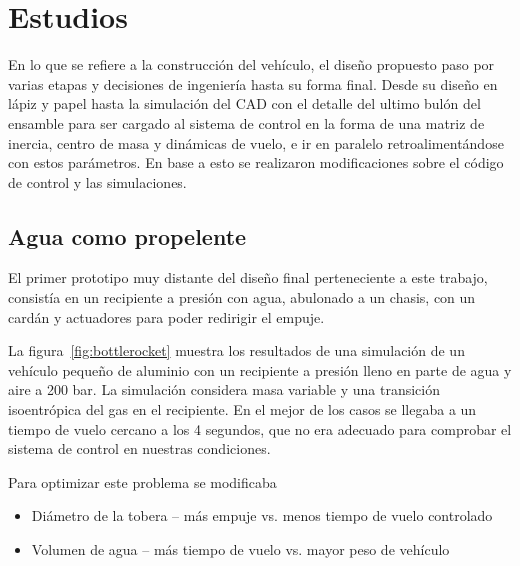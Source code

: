


\section{Estudios}
En lo que se refiere a la construcción del vehículo, el diseño propuesto paso por varias etapas y
decisiones de ingeniería hasta su forma final. Desde su diseño en lápiz y papel hasta la
simulación del CAD con el detalle del ultimo bulón del ensamble para ser cargado al sistema de control en la forma de una matriz de inercia, centro de masa y dinámicas de vuelo, e ir en paralelo retroalimentándose con estos parámetros. En base a esto se realizaron modificaciones sobre el código de control y las simulaciones.


\subsection{Agua como propelente}\label{ssec:propAgua}
El primer prototipo muy distante del diseño final perteneciente a este trabajo, consistía en un
recipiente a presión con agua, abulonado a un chasis, con un cardán y actuadores para poder redirigir el
empuje. 

\medskip

La figura~\ref{fig:bottlerocket} muestra los resultados de una simulación de un vehículo pequeño de aluminio con un recipiente a presión lleno en parte de agua y aire a 200 bar. La simulación considera masa variable y una transición isoentrópica del gas en el recipiente. En el mejor de los casos se llegaba a un tiempo de vuelo cercano a los 4 segundos, que no era adecuado para comprobar el sistema de control en nuestras condiciones. 

Para optimizar este problema se modificaba

\begin{itemize}
    \item Diámetro de la tobera -- más empuje vs. menos tiempo de vuelo controlado
    \item Volumen de agua -- más tiempo de vuelo vs. mayor peso de vehículo
\end{itemize}


